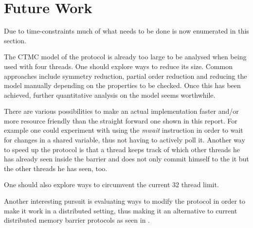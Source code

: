 \documentclass[a4paper, 10pt]{article}
\begin{document}
\section{Future Work}
Due to time-constraints much of what needs to be done is now enumerated in this section.

The CTMC model of the protocol is already too large to be analysed when being used with four threads. One should explore ways to reduce its size. Common approaches include symmetry reduction, partial order reduction and reducing the model manually depending on the properties to be checked. Once this has been achieved, further quantitative analysis on the model seems worthwhile.

There are various possibilities to make an actual implementation faster and/or more resource friendly than the straight forward one shown in this report. For example one could experiment with using the \emph{mwait} instruction in order to wait for changes in a shared variable, thus not having to actively poll it. Another way to speed up the protocol is that a thread keeps track of which other threads he has already seen inside the barrier and does not only commit himself to the it but the other threads he has seen, too.

One should also explore ways to circumvent the current 32 thread limit.

Another interesting pursuit is evaluating ways to modify the protocol in order to make it work in a distributed setting, thus making it an alternative to current distributed memory barrier protocols as seen in \cite{hoefler2005}.

\nocite{*} %

{}
\end{document}
